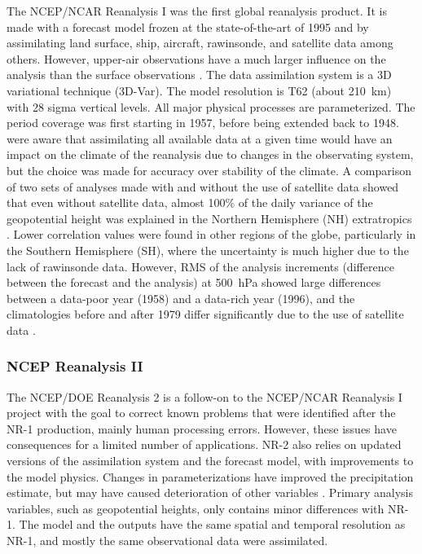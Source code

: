 \documentclass{ametsoc}
\begin{document}
The NCEP/NCAR Reanalysis I \citep[NR-1,][]{Kalnay1996, Kistler2001} was the first global reanalysis product. It is made with a forecast model frozen at the state-of-the-art of 1995 and by assimilating land surface, ship, aircraft, rawinsonde, and satellite data among others. However, upper-air observations have a much larger influence on the analysis than the surface observations \citep{Kistler2001}. The data assimilation system is a 3D variational technique (3D-Var). The model resolution is T62 (about 210~km) with 28 sigma vertical levels. All major physical processes are parameterized. The period coverage was first starting in 1957, before being extended back to 1948. \citet{Kalnay1996} were aware that assimilating all available data at a given time would have an impact on the climate of the reanalysis due to changes in the observating system, but the choice was made for accuracy over stability of the climate. A comparison of two sets of analyses made with and without the use of satellite data showed that even without satellite data, almost 100\% of the daily variance of the geopotential height was explained in the Northern Hemisphere (NH) extratropics \citep{Kalnay1996}. Lower correlation values were found in other regions of the globe, particularly in the Southern Hemisphere (SH), where the uncertainty is much higher due to the lack of rawinsonde data. However, RMS of the analysis increments (difference between the forecast and the analysis) at 500~hPa showed large differences between a data-poor year (1958) and a data-rich year (1996), and the climatologies before and after 1979 differ significantly due to the use of satellite data \citep{Kistler2001}.


\subsubsection{NCEP Reanalysis II}

The NCEP/DOE Reanalysis 2 \citep[NR-2,][]{Kanamitsu2002} is a follow-on to the NCEP/NCAR Reanalysis I project with the goal to correct known problems that were identified after the NR-1 production, mainly human processing errors. However, these issues have consequences for a limited number of applications. NR-2 also relies on updated versions of the assimilation system and the forecast model, with improvements to the model physics. Changes in parameterizations have improved the precipitation estimate, but may have caused deterioration of other variables \citep{Kistler2001, Kanamitsu2002}. Primary analysis variables, such as geopotential heights, only contains minor differences with NR-1. The model and the outputs have the same spatial and temporal resolution as NR-1, and mostly the same observational data were assimilated.
\end{document}
